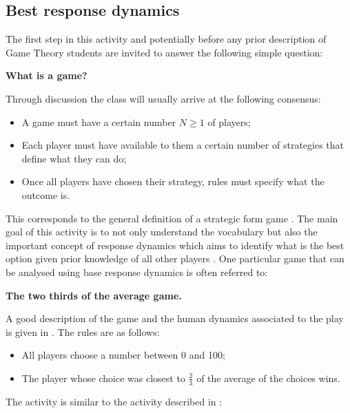 \documentclass{article}
\begin{document}
\subsection{Best response dynamics}\label{sec:best_responses}

The first step in this activity and potentially before any prior description of
Game Theory students are invited to answer the following simple question:

\begin{center}
    \textbf{What is a game?}
\end{center}

Through discussion the class will usually arrive at the following consensus:

\begin{itemize}
    \item A game must have a certain number \(N\geq 1\) of players;
    \item Each player must have available to them a certain number of strategies
        that define what they can do;
    \item Once all players have chosen their strategy, rules must specify what
        the outcome is.
\end{itemize}

This corresponds to the general definition of a strategic form game
\cite{Maschler2013}. The main goal of this activity is to not only understand
the vocabulary but also the important concept of response dynamics which aims
to identify what is the best option given prior knowledge of all other players
\cite{Maschler2013}. One particular game that can be analysed using base
response dynamics is often referred to:

\begin{center}
    \textbf{The two thirds of the average game.}
\end{center}

A good description of the game and the human dynamics associated to the play is
given in \cite{Nagel1995}. The rules are as follows:

\begin{itemize}
    \item All players choose a number between 0 and 100;
    \item The player whose choice was closest to \(\frac{2}{3}\) of the average
        of the choices wins.
\end{itemize}

The activity is similar to the activity described in
\cite{TheEconomicsNetwork2013}:
\end{document}
